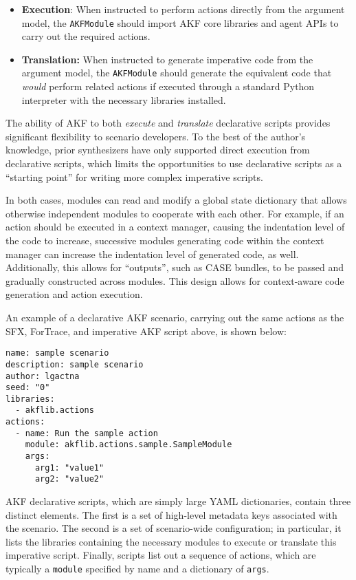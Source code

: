 \begin{itemize}
\tightlist
\item
  \textbf{Execution}: When instructed to perform actions directly from
  the argument model, the \passthrough{\lstinline!AKFModule!} should
  import AKF core libraries and agent APIs to carry out the required
  actions.
\item
  \textbf{Translation:} When instructed to generate imperative code from
  the argument model, the \passthrough{\lstinline!AKFModule!} should
  generate the equivalent code that \emph{would} perform related actions
  if executed through a standard Python interpreter with the necessary
  libraries installed.
\end{itemize}

The ability of AKF to both \emph{execute} and \emph{translate}
declarative scripts provides significant flexibility to scenario
developers. To the best of the author's knowledge, prior synthesizers
have only supported direct execution from declarative scripts, which
limits the opportunities to use declarative scripts as a ``starting
point'' for writing more complex imperative scripts.

In both cases, modules can read and modify a global state dictionary
that allows otherwise independent modules to cooperate with each other.
For example, if an action should be executed in a context manager,
causing the indentation level of the code to increase, successive
modules generating code within the context manager can increase the
indentation level of generated code, as well. Additionally, this allows
for ``outputs'', such as CASE bundles, to be passed and gradually
constructed across modules. This design allows for context-aware code
generation and action execution.

An example of a declarative AKF scenario, carrying out the same actions
as the SFX, ForTrace, and imperative AKF script above, is shown below:

\begin{lstlisting}
name: sample scenario
description: sample scenario
author: lgactna
seed: "0"
libraries:
  - akflib.actions
actions:
  - name: Run the sample action
    module: akflib.actions.sample.SampleModule
    args:
      arg1: "value1"
      arg2: "value2"
\end{lstlisting}

AKF declarative scripts, which are simply large YAML dictionaries,
contain three distinct elements. The first is a set of high-level
metadata keys associated with the scenario. The second is a set of
scenario-wide configuration; in particular, it lists the libraries
containing the necessary modules to execute or translate this imperative
script. Finally, scripts list out a sequence of actions, which are
typically a \passthrough{\lstinline!module!} specified by name and a
dictionary of \passthrough{\lstinline!args!}.

